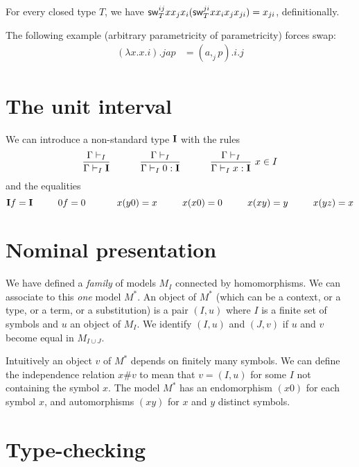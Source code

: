 \documentclass[10pt,a4paper]{article}
\newcommand{\UI}{{\bf I}}
\begin{document}

\begin{theorem}
For every closed type $T$, we have $\mathsf{sw}^{ij}_{T} x x_j x_i (\mathsf{sw}^{ji}_{T} x x_i x_j x_{ji}) = x_{ji}$, definitionally.
\end{theorem}

The following example (arbitrary parametricity of parametricity) forces swap:
\begin{align*}
  (λx. x.i).j a p &= (a ,_j p).i.j
\end{align*}

\section{The unit interval}
 
 We can introduce a non-standard type $\UI$ with the rules
$$
\frac{\Gamma\vdash_I}{\Gamma\vdash_I \UI}~~~~~~~~~\frac{\Gamma\vdash_I}{\Gamma\vdash_I 0:\UI}~~~~~~~~~
\frac{\Gamma\vdash_I}{\Gamma\vdash_I x:\UI}~{x\in I}
$$
and the equalities
$$
\UI f = \UI~~~~~~~~0f = 0~~~~~~~~~~x(y0) = x~~~~~~~~x(x0) = 0~~~~~~~~x(xy) = y~~~~~~~~x(yz) = x
$$



\section{Nominal presentation}

 We have defined a {\em family} of models $M_I$ connected by homomorphisms.
We can associate to this {\em one} model $M^*$. An object of $M^*$ (which can
be a context, or a type, or a term, or a substitution) is a pair $(I,u)$
where $I$ is a finite set of symbols and $u$ an object of $M_I$. We identify
$(I,u)$ and $(J,v)$ if $u$ and $v$ become equal in $M_{I\cup J}$.

\medskip

 Intuitively an object $v$ of $M^*$ depends on finitely many symbols. We can 
define the independence relation $x\#v$ to mean that $v = (I,u)$ for some $I$
not containing the symbol $x$.
The model $M^*$ has an endomorphism $(x0)$ for each symbol $x$, and automorphisms
$(xy)$ for $x$ and $y$ distinct symbols.

\section{Type-checking}
\end{document}
